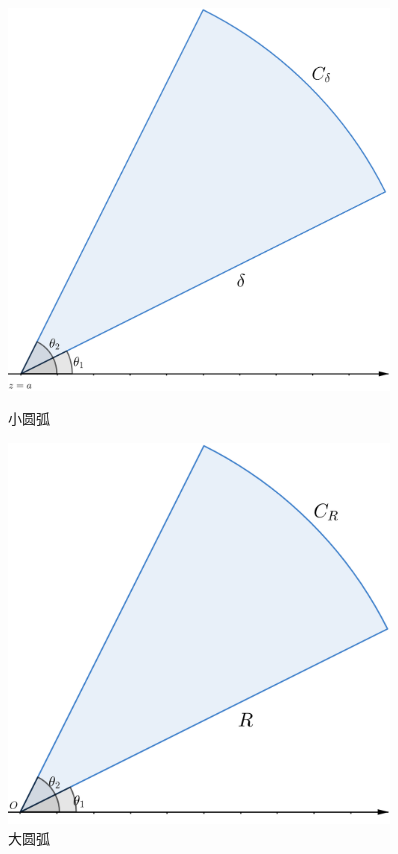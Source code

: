 \documentclass[12pt, a4paper]{ctexbook}
\begin{document}
                \begin{figure}[htbp]
                    \centering
                    \begin{minipage}[t]{0.48\textwidth}
                        \centering
                        \includegraphics[width=0.9\textwidth]{SmallArc.png}
                        \caption{小圆弧}
                        \label{fig:small_arc}
                    \end{minipage}
                    \begin{minipage}[t]{0.48\textwidth}
                        \centering
                        \includegraphics[width=0.9\textwidth]{LargeArc.png}
                        \caption{大圆弧}
                        \label{fig:large_arc}
                    \end{minipage}
                \end{figure}
\end{document}
